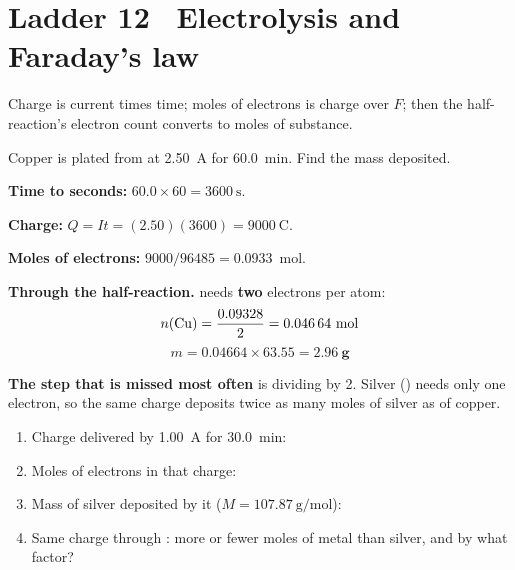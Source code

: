 \documentclass{apchem-worksheet}
\begin{document}
\section*{\sffamily Ladder 12 \textbullet\ Electrolysis and Faraday's law}

Charge is current times time; moles of electrons is charge over $F$; then
the half-reaction's electron count converts to moles of substance.

\begin{workedexample}
Copper is plated from  at \SI{2.50}{\ampere} for
\SI{60.0}{\minute}. Find the mass deposited.

\textbf{Time to seconds:} $60.0 \times 60 = \SI{3600}{\second}$.

\textbf{Charge:} $Q = It = (2.50)(3600) = \SI{9000}{\coulomb}$.

\textbf{Moles of electrons:}
$9000/96485 = \num{0.0933}$~mol.

\textbf{Through the half-reaction.}  needs
\textbf{two} electrons per atom:
\[ n(\ce{Cu}) = \frac{0.09328}{2} = \num{0.04664}~\text{mol} \]
\[ m = 0.04664 \times 63.55 = \mathbf{2.96~g} \]

\textbf{The step that is missed most often} is dividing by 2. Silver
() needs only one electron, so the same charge
deposits twice as many moles of silver as of copper.
\end{workedexample}

\begin{yourturn}
\begin{enumerate}[leftmargin=*,itemsep=0.5em]
  \item Charge delivered by \SI{1.00}{\ampere} for \SI{30.0}{\minute}:
        \workspace[1.4cm]
  \item Moles of electrons in that charge: \workspace[1.6cm]
  \item Mass of silver deposited by it
        ($M = \SI{107.87}{\gram\per\mole}$): \workspace[1.8cm]
  \item Same charge through : more or fewer moles of metal than
        silver, and by what factor? \workspace[1.8cm]
\end{enumerate}
\end{yourturn}
\end{document}
